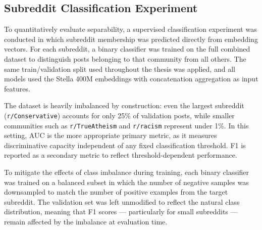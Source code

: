 \subsection{Subreddit Classification Experiment}

To quantitatively evaluate separability, a supervised classification experiment was conducted in which subreddit membership was predicted directly from embedding vectors. For each subreddit, a binary classifier was trained on the full combined dataset to distinguish posts belonging to that community from all others. The same train/validation split used throughout the thesis was applied, and all models used the Stella 400M embeddings with concatenation aggregation as input features.

The dataset is heavily imbalanced by construction: even the largest subreddit (\verb!r/Conservative!) accounts for only 25\% of validation posts, while smaller communities such as \verb!r/TrueAtheism! and \verb!r/racism! represent under 1\%. In this setting, AUC is the more appropriate primary metric, as it measures discriminative capacity independent of any fixed classification threshold. F1 is reported as a secondary metric to reflect threshold-dependent performance.

To mitigate the effects of class imbalance during training, each binary classifier was trained on a balanced subset in which the number of negative samples was downsampled to match the number of positive examples from the target subreddit. The validation set was left unmodified to reflect the natural class distribution, meaning that F1 scores — particularly for small subreddits — remain affected by the imbalance at evaluation time.

